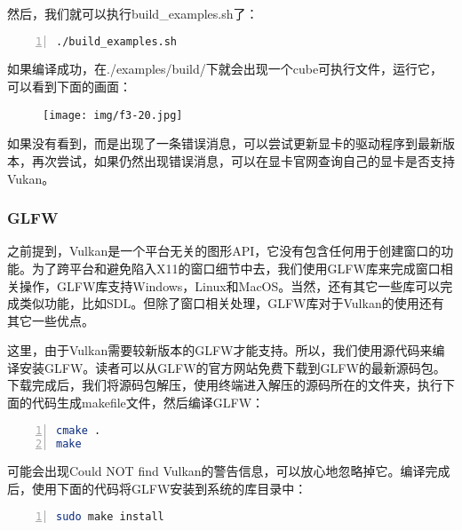 \documentclass{ctexart}
\begin{document}
然后，我们就可以执行build\_examples.sh了：

\begin{lstlisting}[language={bash},keywordstyle=\color{blue!70},commentstyle=\color{red!50!green!50!blue!50},frame=shadowbox, rulesepcolor=\color{red!20!green!20!blue!20},basicstyle=\small,numbers=left, numberstyle=\tiny,breaklines=true]
./build_examples.sh
\end{lstlisting}

如果编译成功，在./examples/build/下就会出现一个cube可执行文件，运行它，可以看到下面的画面：

\begin{figure}[H]
	\centering
	\texttt{[image: img/f3-20.jpg]}
\end{figure}

如果没有看到，而是出现了一条错误消息，可以尝试更新显卡的驱动程序到最新版本，再次尝试，如果仍然出现错误消息，可以在显卡官网查询自己的显卡是否支持Vukan。

\subsubsection{GLFW}

之前提到，Vulkan是一个平台无关的图形API，它没有包含任何用于创建窗口的功能。为了跨平台和避免陷入X11的窗口细节中去，我们使用GLFW库来完成窗口相关操作，GLFW库支持Windows，Linux和MacOS。当然，还有其它一些库可以完成类似功能，比如SDL。但除了窗口相关处理，GLFW库对于Vulkan的使用还有其它一些优点。

这里，由于Vulkan需要较新版本的GLFW才能支持。所以，我们使用源代码来编译安装GLFW。读者可以从GLFW的官方网站免费下载到GLFW的最新源码包。下载完成后，我们将源码包解压，使用终端进入解压的源码所在的文件夹，执行下面的代码生成makefile文件，然后编译GLFW：

\begin{lstlisting}[language={bash},keywordstyle=\color{blue!70},commentstyle=\color{red!50!green!50!blue!50},frame=shadowbox, rulesepcolor=\color{red!20!green!20!blue!20},basicstyle=\small,numbers=left, numberstyle=\tiny,breaklines=true]
cmake .
make
\end{lstlisting}

可能会出现Could NOT find Vulkan的警告信息，可以放心地忽略掉它。编译完成后，使用下面的代码将GLFW安装到系统的库目录中：

\begin{lstlisting}[language={bash},keywordstyle=\color{blue!70},commentstyle=\color{red!50!green!50!blue!50},frame=shadowbox, rulesepcolor=\color{red!20!green!20!blue!20},basicstyle=\small,numbers=left, numberstyle=\tiny,breaklines=true]
sudo make install
\end{lstlisting}
\end{document}
